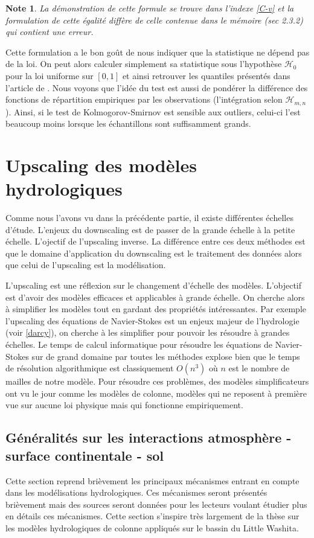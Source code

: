 \documentclass[a4paper,11pt]{article}
\newtheorem{note}{Note}
\begin{document}
\begin{note}
	La démonstration de cette formule se trouve dans l'indexe \ref{C-v} et la formulation de cette égalité diffère de celle contenue dans le mémoire \cite{ethier2011propos}(sec 2.3.2) qui contient une erreur.
\end{note}
Cette formulation a le bon goût de nous indiquer que la statistique ne dépend pas de la loi. On peut alors calculer simplement sa statistique sous l'hypothèse $\mathcal{H}_0$ pour la loi uniforme sur $[0,1]$ et ainsi retrouver les quantiles présentés dans l'article de \cite{buning2002robustness}. Nous voyons que l'idée du test est aussi de pondérer la différence des fonctions de répartition empiriques par les observations (l'intégration selon $\mathcal{H}_{m,n}$). Ainsi, si le test de Kolmogorov-Smirnov est sensible aux outliers, celui-ci l’est beaucoup moins lorsque les échantillons sont suffisamment grands.

\section{Upscaling des modèles hydrologiques}
\label{upscaling}
Comme nous l'avons vu dans la précédente partie, il existe différentes échelles d'étude. L'enjeux du downscaling est de passer de la grande échelle à la petite échelle. L'ojectif de l'upscaling inverse. La différence entre ces deux méthodes est que le domaine d'application du downscaling est le traitement des données alors que celui de l'upscaling est la modélisation. 

L'upscaling est une réflexion sur le changement d'échelle des modèles. L'objectif est d'avoir des modèles efficaces et applicables à grande échelle. On cherche alors à simplifier les modèles tout en gardant des propriétés intéressantes. Par exemple l'upscaling des équations de Navier-Stokes est un enjeux majeur de l'hydrologie (voir \ref{darcy}), on cherche à les simplifier pour pouvoir les résoudre à grandes échelles. Le temps de calcul informatique pour résoudre les équations de Navier-Stokes sur de grand domaine par toutes les méthodes explose bien que le temps de résolution algorithmique est classiquement $O(n^3)$ où $n$ est le nombre de mailles de notre modèle. Pour résoudre ces problèmes, des modèles simplificateurs ont vu le jour comme les modèles de colonne, modèles qui ne reposent à première vue sur aucune loi physique mais qui fonctionne empiriquement.   


\subsection{Généralités sur les interactions atmosphère - surface continentale - sol}
Cette section reprend brièvement les principaux mécanismes entrant en compte dans les modélisations hydrologiques. Ces mécanismes seront présentés brièvement mais des sources seront données pour les lecteurs voulant étudier plus en détails ces mécanismes. Cette section s'inspire très largement de la thèse \cite{maquin2016developpement} sur les modèles hydrologiques de colonne appliqués sur le bassin du Little Washita. 
 
\end{document}
